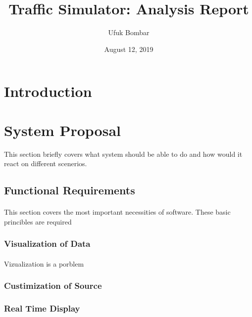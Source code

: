 \documentclass[a4paper, 12pt]{article}
\title{Traffic Simulator: Analysis Report}
\date{August 12, 2019}
\author{Ufuk Bombar}
\begin{document}
    \maketitle
    \newpage
    \tableofcontents
    \newpage

    \section{Introduction}

    \section{System Proposal}
        This section briefly covers what system should be able to do and how would it react on different scenerios.

        \subsection{Functional Requirements} \paragraph{}
            This section covers the most important necessities of software. These basic princibles are required 

            \subsubsection{Visualization of Data} \paragraph{}
                Vizualization is a porblem 

            \subsubsection{Custimization of Source} \paragraph{}
            \subsubsection{Real Time Display} \paragraph{}
\end{document}
